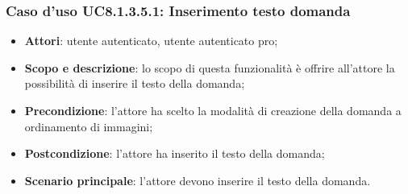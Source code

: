 \subsubsection{Caso d’uso UC8.1.3.5.1: Inserimento testo domanda}
\begin{itemize}
	\item\textbf{Attori}: utente autenticato, utente autenticato pro;
	\item\textbf{Scopo e descrizione}: lo scopo di questa funzionalità è offrire all'attore  la possibilità di inserire il testo della domanda;
	\item\textbf{Precondizione}: l'attore ha scelto la modalità di creazione della domanda a ordinamento di immagini; 
	\item \textbf{Postcondizione}: l'attore ha inserito il testo della domanda;
	\item\textbf{Scenario principale}: l'attore  devono inserire il testo della domanda. 
\end{itemize}

